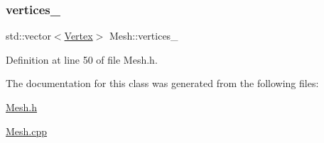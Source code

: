 \mbox{\label{classMesh_a986edf1ab1d37e517ff8adc928519528}} 
\subsubsection{\texorpdfstring{vertices\+\_\+}{vertices\_}}
{\footnotesize\ttfamily std\+::vector$<$\mbox{\hyperlink{structMesh_1_1Vertex}{Vertex}}$>$ Mesh\+::vertices\+\_\+\hspace{0.3cm}{\ttfamily [private]}}



Definition at line 50 of file Mesh.\+h.



The documentation for this class was generated from the following files\+:\begin{DoxyCompactItemize}
\item 
\mbox{\hyperlink{Mesh_8h}{Mesh.\+h}}\item 
\mbox{\hyperlink{Mesh_8cpp}{Mesh.\+cpp}}\end{DoxyCompactItemize}

